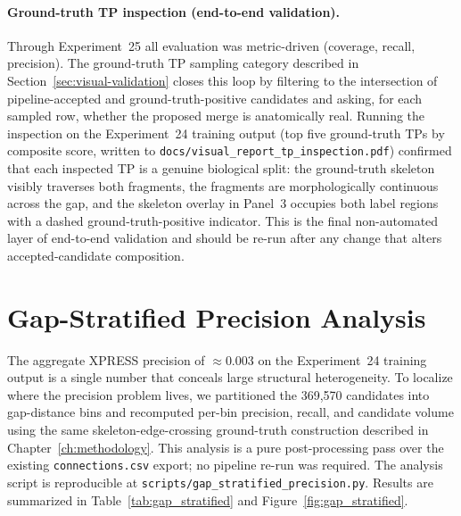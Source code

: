 \paragraph{Ground-truth TP inspection (end-to-end validation).}
Through Experiment~25 all evaluation was metric-driven (coverage, recall,
precision).  The ground-truth TP sampling category described in
Section~\ref{sec:visual-validation} closes this loop by filtering to the
intersection of pipeline-accepted and ground-truth-positive candidates and
asking, for each sampled row, whether the proposed merge is anatomically
real.  Running the inspection on the Experiment~24 training output (top
five ground-truth TPs by composite score, written to
\texttt{docs/visual\_report\_tp\_inspection.pdf}) confirmed that each
inspected TP is a genuine biological split: the ground-truth skeleton
visibly traverses both fragments, the fragments are morphologically
continuous across the gap, and the skeleton overlay in Panel~3 occupies
both label regions with a dashed ground-truth-positive indicator.  This is
the final non-automated layer of end-to-end validation and should be
re-run after any change that alters accepted-candidate composition.

\section{Gap-Stratified Precision Analysis}
\label{sec:gap-stratified}

The aggregate XPRESS precision of $\approx$0.003 on the Experiment~24 training
output is a single number that conceals large structural heterogeneity.  To
localize where the precision problem lives, we partitioned the 369{,}570
candidates into gap-distance bins and recomputed per-bin precision, recall,
and candidate volume using the same skeleton-edge-crossing ground-truth
construction described in Chapter~\ref{ch:methodology}.  This analysis is a
pure post-processing pass over the existing \texttt{connections.csv} export;
no pipeline re-run was required.  The analysis script is reproducible at
\texttt{scripts/gap\_stratified\_precision.py}.  Results are summarized in
Table~\ref{tab:gap_stratified} and Figure~\ref{fig:gap_stratified}.

